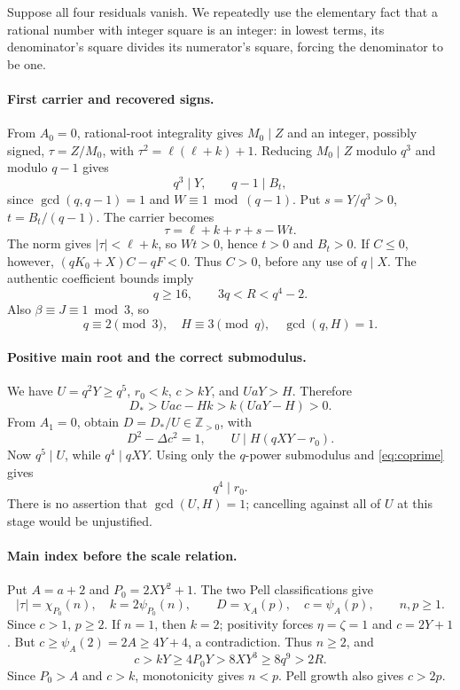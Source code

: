 \documentclass[11pt,a4paper]{article}
\theoremstyle{definition}
\newcommand{\Zp}{\mathbb Z_{>0}}
\newcommand{\Dstar}{D_{\!*}}
\begin{document}
Suppose all four residuals vanish. We repeatedly use the elementary
fact that a rational number with integer square is an integer:
in lowest terms, its denominator's square divides its numerator's
square, forcing the denominator to be one.

\paragraph{First carrier and recovered signs.}
From \(A_0=0\), rational-root integrality gives \(M_0\mid Z\)
and an integer, possibly signed, \(\tau=Z/M_0\), with
\(\tau^2=\ell(\ell+k)+1\).
Reducing \(M_0\mid Z\) modulo \(q^3\) and modulo \(q-1\)
gives
\[
 q^3\mid Y,\qquad q-1\mid B_t,
\]
since \(\gcd(q,q-1)=1\) and \(W\equiv1\bmod(q-1)\).
Put \(s=Y/q^3>0\), \(t=B_t/(q-1)\). The carrier becomes
\[
 \tau=\ell+k+r+s-Wt.
\]
The norm gives \(|\tau|<\ell+k\), so \(Wt>0\), hence
\(t>0\) and \(B_t>0\). If \(C\le0\), however,
\((qK_0+X)C-qF<0\). Thus \(C>0\), before any use of
\(q\mid X\). The authentic coefficient bounds imply
\[
 q\ge16,\qquad 3q<R<q^4-2.                       \label{eq:Rbounds}
\]
Also \(\beta\equiv J\equiv1\bmod3\), so
\[
 q\equiv2\pmod3,\quad H\equiv3\pmod q,\quad
 \gcd(q,H)=1.                                   \label{eq:coprime}
\]

\paragraph{Positive main root and the correct submodulus.}
We have \(U=q^2Y\ge q^5\), \(r_0<k\), \(c>kY\),
and \(UaY>H\). Therefore
\[
 \Dstar>Uac-Hk>k(UaY-H)>0.
\]
From \(A_1=0\), obtain \(D=\Dstar/U\in\Zp\), with
\[
 D^2-\Delta c^2=1,\qquad
 U\mid H(qXY-r_0).                              \label{eq:adaptive-div}
\]
Now \(q^5\mid U\), while \(q^4\mid qXY\).
Using only the \(q\)-power submodulus and
\eqref{eq:coprime} gives
\[
 q^4\mid r_0.                                   \label{eq:q4r0}
\]
There is no assertion that \(\gcd(U,H)=1\); cancelling
against all of \(U\) at this stage would be unjustified.

\paragraph{Main index before the scale relation.}
Put \(A=a+2\) and \(P_0=2XY^2+1\).
The two Pell classifications give
\[
 |\tau|=\chi_{P_0}(n),\quad k=2\psi_{P_0}(n),\qquad
 D=\chi_A(p),\quad c=\psi_A(p),\qquad n,p\ge1.
\]
Since \(c>1\), \(p\ge2\). If \(n=1\), then \(k=2\);
positivity forces \(\eta=\zeta=1\) and \(c=2Y+1\).
But \(c\ge\psi_A(2)=2A\ge4Y+4\), a contradiction.
Thus \(n\ge2\), and
\[
 c>kY\ge4P_0Y>8XY^3\ge8q^9>2R.
\]
Since \(P_0>A\) and \(c>k\), monotonicity gives \(n<p\).
Pell growth also gives \(c>2p\).
\end{document}
